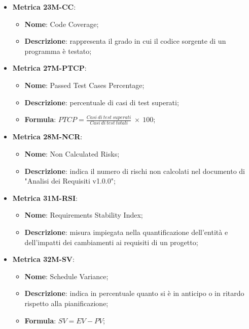 \begin{itemize}
    \item \textbf{Metrica 23M-CC}:
    \begin{itemize}
        \item \textbf{Nome}: Code Coverage;
        \item \textbf{Descrizione}: rappresenta il grado in cui il codice sorgente di un programma è testato;
    \end{itemize}
\end{itemize}

\begin{itemize}
    \item \textbf{Metrica 27M-PTCP}:
    \begin{itemize}
        \item \textbf{Nome}: Passed Test Cases Percentage;
        \item \textbf{Descrizione}: percentuale di casi di test superati;
        \item \textbf{Formula}: $PTCP = \frac{Casi\: di\: test\: superati}{Casi\: di\: test\: totali}\: \times \: 100$;
    \end{itemize}
\end{itemize}

\begin{itemize}
    \item \textbf{Metrica 28M-NCR}:
    \begin{itemize}
        \item \textbf{Nome}: Non Calculated Risks;
        \item \textbf{Descrizione}: indica il numero di rischi non calcolati nel documento di "Analisi dei Requisiti v1.0.0";
    \end{itemize}
\end{itemize}

\begin{itemize}
    \item \textbf{Metrica 31M-RSI}:
    \begin{itemize}
        \item \textbf{Nome}: Requirements Stability Index;
        \item \textbf{Descrizione}: misura impiegata nella quantificazione dell'entità e dell'impatti dei cambiamenti ai requisiti di un progetto;
    \end{itemize}
\end{itemize}

\begin{itemize}
    \item \textbf{Metrica 32M-SV}:
    \begin{itemize}
        \item \textbf{Nome}: Schedule Variance;
        \item \textbf{Descrizione}: indica in percentuale quanto si è in anticipo o in ritardo rispetto alla pianificazione;
        \item \textbf{Formula}: $SV = EV - PV$;
    \end{itemize}
\end{itemize}

